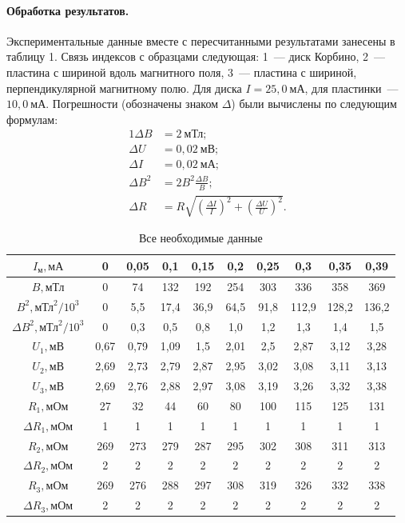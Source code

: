 \documentclass[12pt,a4paper]{article}
\begin{document}
\paragraph{Обработка результатов.} Экспериментальные данные вместе с пересчитанными результатами занесены в таблицу 1. Связь индексов с образцами следующая: 1~--- диск Корбино, 2~--- пластина с шириной вдоль магнитного поля, 3~--- пластина с шириной, перпендикулярной магнитному полю. Для диска $I = 25,0~\text{мА}$, для пластинки~--- $10,0~\text{мА}$. Погрешности (обозначены знаком $\Delta$) были вычислены по следующим формулам:
\begin{alignat}{1}
\Delta B &= 2~\text{мТл}; \\
\Delta U &= 0,02~\text{мВ}; \\
\Delta I &= 0,02~\text{мА}; \\ 
\Delta B^2 &= 2B^2\frac{\Delta B}{B}; \\
\Delta R &= R\sqrt{\left(\frac{\Delta I}{I}\right)^2 + \left(\frac{\Delta U}{U}\right)^2}.
\end{alignat}
\begin{table}[h!]\centering
\begin{tabular}{|*{10}{c|}}
\hline
$I_\text{м}, \text{мА}$&0&0,05&0,1&0,15&0,2&0,25&0,3&0,35&0,39\\
\hline
$B, \text{мТл}$&0&74&132&192&254&303&336&358&369\\
\hline
$B^2, \text{мТл}^2/10^3$&0&5,5&17,4&36,9&64,5&91,8&112,9&128,2&136,2\\
\hline
$\Delta B^2, \text{мТл}^2/10^3$&0&0,3&0,5&0,8&1,0&1,2&1,3&1,4&1,5\\
\hline
$U_1, \text{мВ}$&0,67&0,79&1,09&1,5&2,01&2,5&2,87&3,12&3,28\\
\hline
$U_2, \text{мВ}$&2,69&2,73&2,79&2,87&2,95&3,02&3,08&3,11&3,13\\
\hline
$U_3, \text{мВ}$&2,69&2,76&2,88&2,97&3,08&3,19&3,26&3,32&3,38\\
\hline
$R_1, \text{мОм}$&27&32&44&60&80&100&115&125&131\\
\hline
$\Delta R_1, \text{мОм}$&1&1&1&1&1&1&1&1&1\\
\hline
$R_2, \text{мОм}$&269&273&279&287&295&302&308&311&313\\
\hline
$\Delta R_2, \text{мОм}$&2&2&2&2&2&2&2&2&2\\
\hline
$R_3, \text{мОм}$&269&276&288&297&308&319&326&332&338\\
\hline
$\Delta R_3, \text{мОм}$&2&2&2&2&2&2&2&2&2\\
\hline
\end{tabular}
\caption{Все необходимые данные}
\end{table}
\end{document}
